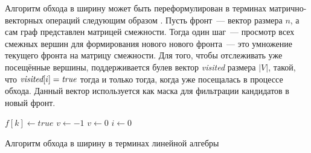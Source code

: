 Алгоритм обхода в ширину может быть переформулирован в терминах матрично-векторных операций следующим образом%
.
Пусть фронт~--- вектор размера $n$, а сам граф представлен матрицей смежности.
Тогда один шаг~--- просмотр всех смежных вершин для формирования нового нового фронта~--- это умножение текущего фронта на матрицу смежности.
Для того, чтобы отслеживать уже посещённые вершины, поддерживается булев вектор \emph{visited} размера $|V|$, такой, что $\emph{visited}[i] = \emph{true}$ тогда и только тогда, когда   уже посещалась в процессе обхода.
Данный вектор используется как маска для фильтрации кандидатов в новый фронт.

\begin{algorithm}
    $f[k] \leftarrow true$\;
    $v \leftarrow -1$\;
    $v \leftarrow 0$\;
    $i \leftarrow 0$\;
    \;
    \caption{Алгоритм обхода в ширину в терминах линейной алгебры}
    \label{algo:BFS_linal}
\end{algorithm}

